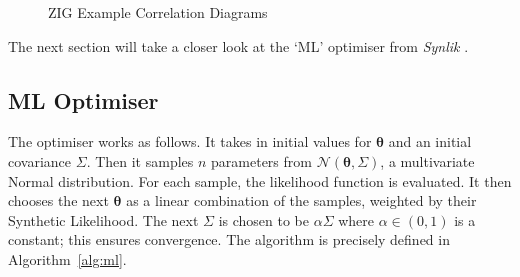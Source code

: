 \begin{figure}[H]
        \centering
        \qquad
        \caption{ZIG Example Correlation Diagrams}
        \label{fig:zigcd}
\end{figure}

The next section will take a closer look at the `ML' optimiser from \emph{Synlik} \citep{synlik_2014}.

\subsection{ML Optimiser}
The optimiser works as follows. It takes in initial values for $\pmb{\theta}$ and an initial covariance $\Sigma$. Then it samples $n$ parameters from $\mathcal{N}(\pmb{\theta}, \Sigma)$, a multivariate Normal distribution. For each sample, the likelihood function is evaluated. It then chooses the next $\pmb{\theta}$ as a linear combination of the samples, weighted by their Synthetic Likelihood. The next $\Sigma$ is chosen to be $\alpha \Sigma$ where $\alpha \in (0,1)$ is a constant; this ensures convergence. The algorithm is precisely defined in Algorithm~\ref{alg:ml}.


